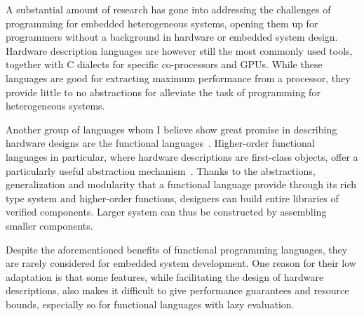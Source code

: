 \documentclass[../main.tex]{subfiles}
\begin{document}

A substantial amount of research has gone into addressing the challenges of programming for embedded heterogeneous systems, opening them up for programmers without a background in hardware or embedded system design. Hardware description languages are however still the most commonly used tools, together with C dialects for specific co-processors and GPUs. While these languages are good for extracting maximum performance from a processor, they provide little to no abstractions for alleviate the task of programming for heterogeneous systems.


Another group of languages whom I believe show great promise in describing hardware designs are the functional languages~\cite{sheeran2005}. Higher-order functional languages in particular, where hardware descriptions are first-class objects, offer a particularly useful abstraction mechanism~\cite{baaij2010, bjesse1998, gill2010}. Thanks to the abstractions, generalization and modularity that a functional language provide through its rich type system and higher-order functions, designers can build entire libraries of verified components. Larger system can thus be constructed by assembling smaller components.


Despite the aforementioned benefits of functional programming languages, they are rarely considered for embedded system development. One reason for their low adaptation is that some features, while facilitating the design of hardware descriptions, also makes it difficult to give performance guarantees and resource bounds, especially so for functional languages with lazy evaluation.
\end{document}
